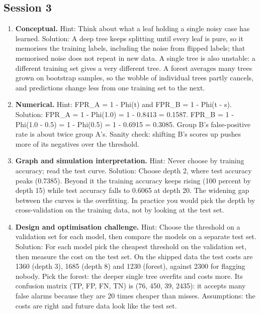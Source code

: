 \documentclass[11pt,a4paper]{article}
\begin{document}
\subsection*{Session 3}
\begin{enumerate}[nosep]
\item \textbf{Conceptual.} Hint: Think about what a leaf holding a single noisy case has learned. Solution: A deep tree keeps splitting until every leaf is pure, so it memorises the training labels, including the noise from flipped labels; that memorised noise does not repeat in new data. A single tree is also unstable: a different training set gives a very different tree. A forest averages many trees grown on bootstrap samples, so the wobble of individual trees partly cancels, and predictions change less from one training set to the next.
\item \textbf{Numerical.} Hint: FPR\_A = 1 - Phi(t) and FPR\_B = 1 - Phi(t - s). Solution: FPR\_A = 1 - Phi(1.0) = 1 - 0.8413 = 0.1587. FPR\_B = 1 - Phi(1.0 - 0.5) = 1 - Phi(0.5) = 1 - 0.6915 = 0.3085. Group B's false-positive rate is about twice group A's. Sanity check: shifting B's scores up pushes more of its negatives over the threshold.
\item \textbf{Graph and simulation interpretation.} Hint: Never choose by training accuracy; read the test curve. Solution: Choose depth 2, where test accuracy peaks (0.7385). Beyond it the training accuracy keeps rising (100 percent by depth 15) while test accuracy falls to 0.6065 at depth 20. The widening gap between the curves is the overfitting. In practice you would pick the depth by cross-validation on the training data, not by looking at the test set.
\item \textbf{Design and optimisation challenge.} Hint: Choose the threshold on a validation set for each model, then compare the models on a separate test set. Solution: For each model pick the cheapest threshold on the validation set, then measure the cost on the test set. On the shipped data the test costs are 1360 (depth 3), 1685 (depth 8) and 1230 (forest), against 2300 for flagging nobody. Pick the forest: the deeper single tree overfits and costs more. Its confusion matrix (TP, FP, FN, TN) is (76, 450, 39, 2435): it accepts many false alarms because they are 20 times cheaper than misses. Assumptions: the costs are right and future data look like the test set.
\end{enumerate}
\end{document}
